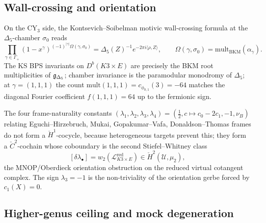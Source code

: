 \subsection{Wall-crossing and orientation}

On the CY$_3$ side, the Kontsevich--Soibelman motivic wall-crossing formula
at the $\Delta_5$-chamber $\sigma_0$ reads
\[
\prod_{\gamma \in \Gamma_+}(1 - x^\gamma)^{(-1)^{|\gamma|}\Omega(\gamma, \sigma_0)}
= \Delta_5(Z)^{-1} e^{-2\pi i \langle \rho, Z\rangle},
\qquad \Omega(\gamma, \sigma_0) = \mathrm{mult}_{\mathrm{BKM}}(\alpha_\gamma).
\]
The KS BPS invariants on $D^b(K3 \times E)$ are precisely the BKM root
multiplicities of $\mathfrak{g}_{\Delta_5}$; chamber invariance is the paramodular
monodromy of $\Delta_5$; at $\gamma = (1, 1, 1)$ the count
$\mathrm{mult}(1,1,1) = c_{\phi_{0,1}}(3) = -64$ matches the diagonal
Fourier coefficient $f(1, 1, 1) = 64$ up to the fermionic sign.

The four frame-naturality constants $(\lambda_1, \lambda_2, \lambda_3, \lambda_4) = (\tfrac{1}{2}, c \mapsto c_0 - 2c_1, -1, \nu_B)$
relating Eguchi--Hirzebruch, Mukai, Gopakumar--Vafa, Donaldson--Thomas
frames do not form a $\check{H}^1$-cocycle, because heterogeneous targets prevent
this; they form a $\check{C}^2$-cochain whose coboundary is the second
Stiefel--Whitney class
\[
[\delta \lambda_\bullet] = w_2(\mathcal{L}^{\mathrm{red}}_{K3\times E})
\in \check{H}^2(\mathcal{U}, \mu_2),
\]
the MNOP/Oberdieck orientation obstruction on the reduced virtual
cotangent complex. The sign $\lambda_3 = -1$ is the non-triviality of the
orientation gerbe forced by $c_1(X) = 0$.

\subsection{Higher-genus ceiling and mock degeneration}

